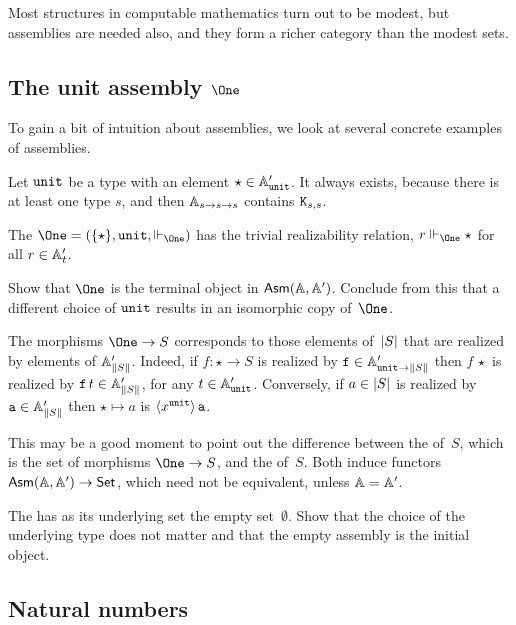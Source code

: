 Most structures in computable mathematics turn out to be modest, but assemblies are needed also, and they form a richer category than the modest sets.

\subsection{The unit assembly $\One$}
\label{sec:asm-unit}

To gain a bit of intuition about assemblies, we look at several concrete examples of assemblies.

Let $\unit$ be a type with an element $\ttunit \in \subAtyp{\unit}$.
It always exists, because there is at least one type $s$, and then
$\Atyp{s \to s \to s}$ contains $\combK_{s,s}$.

The  $\One = (\set{\star}, \unit, {\rz[\One]})$ has the trivial realizability relation, $r \rz[\One] \star$ for all $r \in \subAtyp{t}$.

\begin{exercise}
  Show that $\One$ is the terminal object
  in $\AsmA$. Conclude from this that a different choice of $\unit$ results in an isomorphic copy of~$\One$.
\end{exercise}

The morphisms $\One \to S$ corresponds to those elements of~$\S{S}$ that are realized by elements of $\subAtyp{\T{S}}$. Indeed, if $f : \star \to S$ is realized by $\R{f} \in \subAtyp{\unit \to \T{S}}$ then $f \, \star$ is realized by $\R{f} \, t \in \subAtyp{\T{S}}$, for any $t \in \subAtyp{\unit}$. Conversely, if $a \in \S{S}$ is realized by $\R{a} \in \subAtyp{\T{S}}$ then $\star \mapsto a$ is $\tpcalam{x}{\unit}{\R{a}}$.

This may be a good moment to point out the difference between the  of~$S$, which is the set of morphisms $\One \to S$, and the  of~$S$. Both induce functors $\AsmA \to \Set$, which need not be equivalent, unless $\AA = \subAA$.

\begin{exercise}
  The  has as its underlying set the empty set~$\emptyset$. Show that the choice of the underlying type does not matter and that the empty assembly is the initial object.
\end{exercise}


\subsection{Natural numbers}
\label{sec:asm-natural-numbers}

